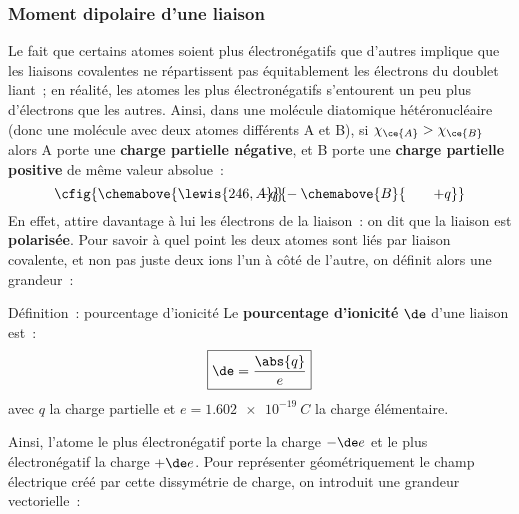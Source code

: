 \documentclass[../main/main.tex]{subfiles}
\begin{document}
\subsubsection{Moment dipolaire d'une liaison}

Le fait que certains atomes soient plus électronégatifs que d'autres implique
que les liaisons covalentes ne répartissent pas équitablement les électrons du
doublet liant~; en réalité, les atomes les plus électronégatifs s'entourent un
peu plus d'électrons que les autres. Ainsi, dans une molécule diatomique
hétéronucléaire (donc une molécule avec deux atomes différents A et B), si
$\chi_{\ce{A}} > \chi_{\ce{B}}$ alors A porte une \textbf{charge partielle
négative}, et B porte une \textbf{charge partielle positive} de même valeur
absolue~:
\[
    \cfig{
        \chemabove{\lewis{246,A}}{\hspace{-20pt}-q}-
        \chemabove{B}{\hspace{20pt}+q}
    }
\]
En effet,  attire davantage à lui les électrons de la liaison~: on dit que
la liaison est \textbf{polarisée}. Pour savoir à quel point les deux atomes sont
liés par liaison covalente, et non pas juste deux ions l'un à côté de l'autre,
on définit alors une grandeur~:

\begin{tdefi}{Définition~: pourcentage d'ionicité}
    Le \textbf{pourcentage d'ionicité} $\de$ d'une liaison est~:
    \[\boxed{\de = \frac{\abs{q}}{e}}\]
    avec $q$ la charge partielle et $e = \SI{1.602e-19}{C}$ la charge
    élémentaire.
\end{tdefi}

Ainsi, l'atome le plus électronégatif porte la charge $-\de e$ et le plus
électronégatif la charge $+\de e$. Pour représenter géométriquement le champ
électrique créé par cette dissymétrie de charge, on introduit une grandeur
vectorielle~:
\end{document}
